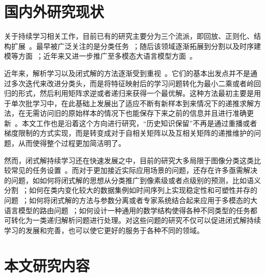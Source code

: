 \section{国内外研究现状}

关于持续学习相关工作，目前已有的研究主要分为三个流派，即回放、正则化、结构扩展~\citep{wang2024survey,zhou2024class,zhou2023cil_survey_zh,wang2025llm_cl_zh,leo2024survey}。最早被广泛关注的是分类任务~\citep{rebuffi2017icarl,kirkpatrick2017ewc,li2017learning}；随后该领域逐渐拓展到分割以及时序建模等方面~\citep{cermelli2020mib,douillard2021plop,qiao2024tscil,huo2025continue}；近年来又进一步推广至多模态大语言模型方面~\citep{zhai2023investigating,wu2024continual,shi2024continual,guo2025mcitlib,zhao2025mllm}。



近年来，解析学习以及闭式解的方法逐渐受到重视~\citep{zhuang2022acil,zhuang2024dsal,fang2024air,GKEAL_Zhuang_CVPR2023,GACL_Zhuang_NeurIPS2024,ZHUANG2024107285,he2024realrepresentationenhancedanalytic}。它们的基本出发点并不是通过多次迭代来改进分类头，而是将特征映射后的学习问题转化为最小二乘或者岭回归的形式，然后利用矩阵求逆或者递归来获得一个最优解。这种方法最初主要是用于单次批学习中，在此基础上发展出了适应不断有新样本到来情况下的递推求解方法，在无需访问旧的原始样本的情况下也能保存下来之前的信息并且进行准确更新~\citep{zhuang2022acil,zhuang2024dsal,fang2024air,AEF-OCL_Zhuang_TVT2024}。本文工作也是沿着这个方向进行研究，“历史知识保留”不再是通过重播或者梯度限制的方式实现，而是转变成对于自相关矩阵以及互相关矩阵的递推维护的问题，从而使得整个过程更加简洁明了。

然而，闭式解持续学习还在快速发展之中，目前的研究大多局限于图像分类这类比较常见的任务设置~\citep{zhuang2022acil,GKEAL_Zhuang_CVPR2023,fang2024air}。而对于更加接近实际应用场景的问题，还存在许多亟需解决的问题，如如何将闭式解的思想从分类推广到像素级或者点级别的预测，比如语义分割~\citep{cermelli2020mib,douillard2021plop}；如何在类内变化较大的数据集例如时间序列上实现稳定性和可塑性并存的问题~\citep{qiao2024tscil,huo2025continue}；如何将闭式解的方法与参数分离或者专家系统结合起来应用于多模态的大语言模型的路由问题~\citep{hu2021lora,wang2023orthogonal,chen2024coin,zhao2025mllm}；如何设计一种通用的数学结构使得各种不同类型的任务都可转化为一类递归解析问题进行处理。对这些问题的研究不仅可以促进闭式解持续学习的发展和完善，也可以使它更好的服务于各种不同的领域。

\section{本文研究内容}

